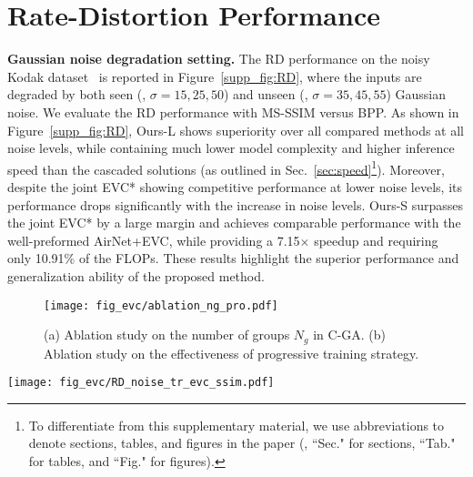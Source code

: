 \section{Rate-Distortion Performance}\label{sec:RD_noise} 
\noindent \textbf{Gaussian noise degradation setting.} The RD performance on the noisy Kodak dataset~\cite{kodak1993kodak} is reported in Figure~\ref{supp_fig:RD}, where the inputs are degraded by both seen (\ie, $\sigma=15,25,50$) and unseen  (\ie, $\sigma=35,45,55$) Gaussian noise.  We evaluate the RD performance with MS-SSIM versus BPP. As shown in Figure~\ref{supp_fig:RD}, Ours-L shows superiority over all compared methods at all noise levels, while containing much lower model complexity and higher inference speed than the cascaded solutions (as outlined in Sec.~\ref{sec:speed}\footnote{To differentiate from this supplementary material, we use abbreviations to denote sections, tables, and figures in the paper (\ie, ``Sec." for sections, ``Tab." for tables, and ``Fig." for figures).}). Moreover, despite the joint EVC*  showing competitive performance at lower noise levels, its performance drops significantly with the increase in noise levels. Ours-S surpasses the joint EVC* by a large margin and achieves comparable performance with the well-preformed AirNet+EVC, while providing a 7.15$\times$ speedup and requiring only 10.91\% of the FLOPs. These results highlight the superior performance and generalization ability of the proposed method.


\begin{figure}[t]
\centering
\texttt{[image: fig\_evc/ablation\_ng\_pro.pdf]}\vspace{-2pt}
\caption{(a) Ablation study on the number of groups $N_g$ in C-GA. (b) Ablation study on the effectiveness of progressive training strategy.} 
\label{supp_fig:ablation}
\end{figure}


\begin{figure*}[t]
 \centering
\texttt{[image: fig\_evc/RD\_noise\_tr\_evc\_ssim.pdf]}\vspace{-4pt}
\caption{RD performance evaluation on the Kodak dataset~\cite{kodak1993kodak}, where inputs are corrupted by known levels (\ie, 15, 25 and 50) and unknown levels (\ie, 35, 45 and 55) of Gaussian noise. We evaluate the results with MS-SSIM. }   
\label{supp_fig:RD}
\end{figure*}



